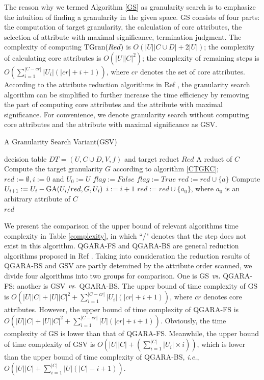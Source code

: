 \documentclass[review]{elsarticle}
\begin{document}
	The reason why we termed Algorithm \ref{GS} as granularity search is to emphasize the intuition of finding a granularity in the given space. GS consists of four parts: the computation of target granularity, the calculation of core attributes, the selection of attribute with maximal significance, termination judgment. The complexity of computing ${\rm TGran}(Red)$ is $O(|U||C\cup D|+2|U|)$; the complexity of calculating core attributes is $O(|U||C|^2)$; the complexity of remaining steps is $O(\sum_{i=1}^{|C-cr|}|U_i|(|cr|+i+1))$, where $cr$ denotes the set of core attributes. According to the attribute reduction algorithms in Ref \cite{ge2017quick,li2014quick}, the granularity search algorithm can be simplified to further increase the time efficiency by removing the part of computing core attributes and the attribute with maximal significance. For convenience, we denote granularity search without computing core attributes and the attribute with maximal significance as GSV. 
	\begin{algorithm}[htb]
		\caption{A Granularity Search Variant(GSV)}
		\label{GSV}
		\begin{algorithmic}[1]
			\Require decision table $DT=(U, C \cup D,V,f)$ and target reduct $Red$
			\Ensure A reduct of $C$
			\State Compute the target granularity $G$ according to algorithm \ref{CTGKC};
			\State $red:=\emptyset, i:=0$ and $U_0:=U$
			\State $flag:=False$
			\State $flag:=True$
			\State $red:=red \cup \{a\}$
			\State Compute $U_{i+1}:=U_i-{\rm GA}(U_i/red,G,U_i)$
			\State $i:=i+1$
			\EndIf
			\EndFor
			\State $red:=red \cup \{a_0\}$, where $a_0$ is an arbitrary attribute of $C$
			\EndIf
			\EndWhile\\
			\Return $red$
		\end{algorithmic}
	\end{algorithm}
	\par We present the comparison of the upper bound of relevant algorithms time complexity in Table \ref{complexity}, in which ``/" denotes that the step does not exist in this algorithm. QGARA-FS and QGARA-BS are general reduction algorithms proposed in Ref \cite{ge2017quick}. Taking into consideration the reduction results of QGARA-BS and GSV are partly detemined by the attribute order scanned, we divide four algorithms into two groups for comparison. One is GS $\emph{vs.}$ QGARA-FS; another is GSV $\emph{vs.}$ QGARA-BS. The upper bound of time complexity of GS is $O(|U||C|+|U||C|^2+\sum_{i=1}^{|C-cr|}|U_i|(|cr|+i+1))$, where $cr$ denotes core attributes. However, the upper bound of time complexity of QGARA-FS is  $O(|U||C|+|U||C|^2+\sum_{i=1}^{|C-cr|}|U|(|cr|+i+1))$. Obviously, the time complexity of GS is lower than that of QGARA-FS. Meanwhile, the upper bound of time complexity of GSV is $O(|U||C|+(\sum_{i=1}^{|C|}|U_i|\times i))$, which is lower than the upper bound of time complexity of QGARA-BS, \emph{i.e.}, $O(|U||C|+\sum_{i=1}^{|C|}|U|(|C|-i+1))$.
\end{document}
